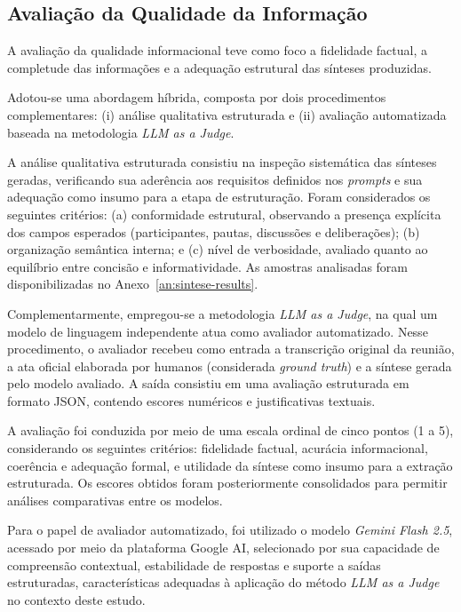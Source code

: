 \subsection{Avaliação da Qualidade da Informação}

A avaliação da qualidade informacional teve como foco a fidelidade factual, a completude das informações e a adequação estrutural das sínteses produzidas. 

Adotou-se uma abordagem híbrida, composta por dois procedimentos complementares: (i) análise qualitativa estruturada e (ii) avaliação automatizada baseada na metodologia \textit{LLM as a Judge}.

A análise qualitativa estruturada consistiu na inspeção sistemática das sínteses geradas, verificando sua aderência aos requisitos definidos nos \textit{prompts} e sua adequação como insumo para a etapa de estruturação. Foram considerados os seguintes critérios: (a) conformidade estrutural, observando a presença explícita dos campos esperados (participantes, pautas, discussões e deliberações); (b) organização semântica interna; e (c) nível de verbosidade, avaliado quanto ao equilíbrio entre concisão e informatividade. As amostras analisadas foram disponibilizadas no Anexo~\ref{an:sintese-results}.

Complementarmente, empregou-se a metodologia \textit{LLM as a Judge}, na qual um modelo de linguagem independente atua como avaliador automatizado. Nesse procedimento, o avaliador recebeu como entrada a transcrição original da reunião, a ata oficial elaborada por humanos (considerada \textit{ground truth}) e a síntese gerada pelo modelo avaliado. A saída consistiu em uma avaliação estruturada em formato JSON, contendo escores numéricos e justificativas textuais.

A avaliação foi conduzida por meio de uma escala ordinal de cinco pontos (1 a 5), considerando os seguintes critérios: fidelidade factual, acurácia informacional, coerência e adequação formal, e utilidade da síntese como insumo para a extração estruturada. Os escores obtidos foram posteriormente consolidados para permitir análises comparativas entre os modelos.

Para o papel de avaliador automatizado, foi utilizado o modelo \textit{Gemini Flash 2.5}, acessado por meio da plataforma Google AI, selecionado por sua capacidade de compreensão contextual, estabilidade de respostas e suporte a saídas estruturadas, características adequadas à aplicação do método \textit{LLM as a Judge} no contexto deste estudo.